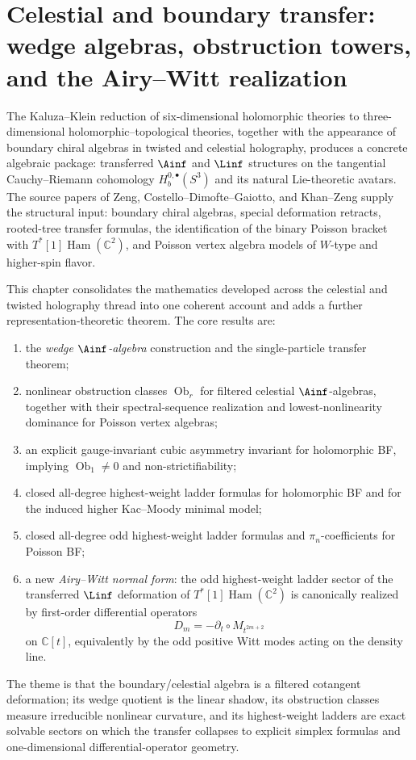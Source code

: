 \chapter{Celestial and boundary transfer: wedge algebras, obstruction towers, and the Airy--Witt realization}

The Kaluza--Klein reduction of six-dimensional holomorphic theories to
three-dimensional holomorphic--topological theories, together with the
appearance of boundary chiral algebras in twisted and celestial
holography, produces a concrete algebraic package: transferred
$\Ainf$ and $\Linf$ structures on the tangential Cauchy--Riemann
cohomology $H_b^{0,\bullet}(S^3)$ and its natural Lie-theoretic
avatars. The source papers of Zeng, Costello--Dimofte--Gaiotto, and
Khan--Zeng supply the structural input: boundary chiral algebras,
special deformation retracts, rooted-tree transfer formulas, the
identification of the binary Poisson bracket with
$T^*[1]\operatorname{Ham}(\mathbb{C}^2)$, and Poisson vertex algebra models of
$W$-type and higher-spin flavor.

This chapter consolidates the mathematics developed across the
celestial and twisted holography thread into one coherent account and
adds a further representation-theoretic theorem. The core results
are:
\begin{enumerate}[label=\textup{(\arabic*)},leftmargin=2.2em]
\item the \emph{wedge $\Ainf$-algebra} construction and the
 single-particle transfer theorem;
\item nonlinear obstruction classes $\operatorname{Ob}_r$ for filtered celestial
 $\Ainf$-algebras, together with their spectral-sequence realization
 and lowest-nonlinearity dominance for Poisson vertex algebras;
\item an explicit gauge-invariant cubic asymmetry invariant for
 holomorphic BF, implying $\operatorname{Ob}_1\neq 0$ and
 non-strictifiability;
\item closed all-degree highest-weight ladder formulas for holomorphic
 BF and for the induced higher Kac--Moody minimal model;
\item closed all-degree odd highest-weight ladder formulas and
 $\pi_n$-coefficients for Poisson BF;
\item a new \emph{Airy--Witt normal form}: the odd highest-weight
 ladder sector of the transferred $\Linf$ deformation of
 $T^*[1]\operatorname{Ham}(\mathbb{C}^2)$ is canonically realized by first-order
 differential operators
 \[
 D_m=-\partial_t\circ M_{t^{2m+2}}
 \]
 on $\mathbb{C}[t]$, equivalently by the odd positive Witt modes
 acting on the density line.
\end{enumerate}
The theme is that the boundary/celestial algebra is a filtered
cotangent deformation; its wedge quotient is the linear shadow, its
obstruction classes measure irreducible nonlinear curvature, and its
highest-weight ladders are exact solvable sectors on which the
transfer collapses to explicit simplex formulas and one-dimensional
differential-operator geometry.


